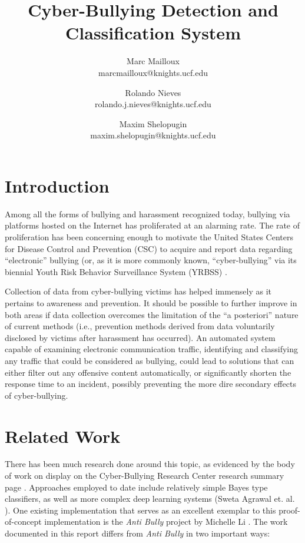 \documentclass[conference]{sig-alternate-05-2015}
\begin{document}
\title{Cyber-Bullying Detection and Classification System}



\author{
  Marc Mailloux\\ marcmailloux@knights.ucf.edu
  \and Rolando Nieves\\ rolando.j.nieves@knights.ucf.edu
  \and Maxim Shelopugin\\ maxim.shelopugin@knights.ucf.edu
}

\maketitle


\section{Introduction}\label{sec:introduction}
Among all the forms of bullying and harassment recognized today, bullying via
platforms hosted on the Internet has proliferated at an alarming rate. The rate
of proliferation has been concerning enough to motivate the United States
Centers for Disease Control and Prevention (CSC) to acquire and report data
regarding ``electronic'' bullying (or, as it is more commonly known,
``cyber-bullying'' via its biennial Youth Risk Behavior Surveillance System
(YRBSS) \cite{CBRC_facts2018}.

Collection of data from cyber-bullying victims has helped immensely as it
pertains to awareness and prevention. It should be possible to further improve
in both areas if data collection overcomes the limitation of the
``a posteriori'' nature of current methods (i.e., prevention methods derived
from data voluntarily disclosed by victims after harassment has occurred). An
automated system capable of examining electronic communication traffic,
identifying and classifying any traffic that could be considered as bullying,
could lead to solutions that can either filter out any offensive content
automatically, or significantly shorten the response time to an incident,
possibly preventing the more dire secondary effects of cyber-bullying.


\section{Related Work}\label{sec:related}

There has been much research done around this topic, as evidenced by the body of
work on display on the Cyber-Bullying Research Center research summary page
\cite{CBRC_research2018}. Approaches employed to date include relatively
simple Bayes type classifiers, as well as more complex deep learning systems
(Sweta Agrawal et. al. \cite{agrawal2018deep}). One existing implementation that
serves as an excellent exemplar to this proof-of-concept implementation is the
\textit{Anti Bully} project by Michelle Li \cite{Li2016}. The work documented
in this report differs from \textit{Anti Bully} in two important ways:
\end{document}
